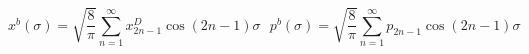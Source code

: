 \begin{equation}x^b(\sigma)=\sqrt{\frac{8}{\pi}}\sum_{n=1}^\infty x^D_{2n-1}
\cos(2n-1)\sigma\ \ \
p^b(\sigma)=\sqrt{\frac{8}{\pi}}\sum_{n=1}^\infty p_{2n-1}
\cos(2n-1)\sigma \label{eq:bit}\end{equation} 
